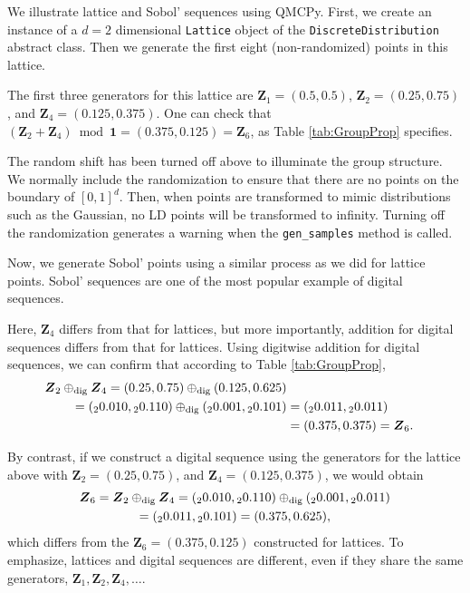 \documentclass[graybox]{svmult}
\begin{document}
We illustrate lattice and Sobol' sequences using QMCPy. First, we create an instance of a $d=2$ dimensional \texttt{Lattice} object of the  \texttt{DiscreteDistribution} abstract class. Then we generate the first eight (non-randomized) points in this lattice. 

The first three generators for this lattice are $\boldsymbol{Z}_1 = (0.5, 0.5)$, $\boldsymbol{Z}_2 = (0.25, 0.75)$, and $\boldsymbol{Z}_4 = (0.125, 0.375)$.  One can check that $(\boldsymbol{Z}_2 + \boldsymbol{Z}_4) \bmod \boldsymbol{1} = (0.375, 0.125) = \boldsymbol{Z}_6$, as Table \ref{tab:GroupProp} specifies.

The random shift has been turned off above to illuminate the group structure.  We normally include the randomization to ensure that there are no points on the boundary of $[0,1]^d$.  Then, when points are transformed to mimic distributions such as the Gaussian, no LD points will be transformed to infinity.  Turning off the randomization generates a warning when the \texttt{gen\_samples} method is called.

Now, we generate Sobol' points using a similar process as we did for lattice points.  Sobol' sequences are one of the most popular example of digital sequences.

Here, $\boldsymbol{Z}_4$ differs from that for lattices, but more importantly, addition for digital sequences differs from that for lattices.  Using digitwise addition for digital sequences, we can confirm that according to Table \ref{tab:GroupProp},
\begin{align*}
\boldsymbol{Z}_2 \oplus_{\textup{dig}} \boldsymbol{Z}_4 = (0.25,0.75)  \oplus_{\textup{dig}} (0.125,0.625) \\
=  ({}_20.010,{}_20.110)  \oplus_{\textup{dig}} ({}_20.001,{}_20.101) &= ({}_20.011,{}_20.011) \\
& = (0.375,0.375) = \boldsymbol{Z}_6.
\end{align*}

By contrast, if we construct a digital sequence using the generators for the lattice above with $\boldsymbol{Z}_2 = (0.25, 0.75)$, and $\boldsymbol{Z}_4 = (0.125, 0.375)$, we would obtain
\begin{multline*}
\boldsymbol{Z}_6 = \boldsymbol{Z}_2 \oplus_{\textup{dig}} \boldsymbol{Z}_4   = ({}_20.010,{}_20.110)  \oplus_{\textup{dig}} ({}_20.001,{}_20.011)  \\
= ({}_20.011,{}_20.101) = (0.375, 0.625),
\end{multline*}
which differs from the $\boldsymbol{Z}_6=(0.375, 0.125)$ constructed for lattices.  To emphasize, lattices and digital sequences are different, even if they share the same generators, $\boldsymbol{Z}_1, \boldsymbol{Z}_2, \boldsymbol{Z}_4, \ldots$.
\end{document}
